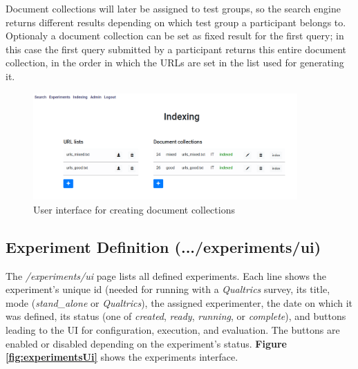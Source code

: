 \documentclass[fleqn]{article}
\begin{document}
Document collections will later be assigned 
to test groups, so the search engine returns different results depending on which test group a participant belongs to. Optionaly
a document collection can be set as fixed result for the first query; in this case the first query submitted by a
participant returns this entire document collection, in the order in which the URLs are set in the list used for generating it.

\begin{figure} [h]
\centering
\includegraphics[width=0.9\textwidth]{img/indexingUi}
\caption{User interface for creating document collections}
\label{fig:indexingUi}
\end{figure}

\newpage


\subsection{Experiment Definition \small{(.../experiments/ui)}}

The \emph{/experiments/ui} page lists all defined experiments. Each line shows the experiment's unique id (needed for running
with a \emph{Qualtrics} survey, its title, mode (\emph{stand\_alone} or \emph{Qualtrics}), the assigned experimenter, the date on which it was defined, 
its status (one of \emph{created}, \emph{ready}, \emph{running}, or \emph{complete}), and buttons leading to the UI for configuration,
execution, and evaluation. The buttons are enabled or disabled depending on the experiment's status. \textbf{Figure \ref{fig:experimentsUi}}
shows the experiments interface.
\end{document}
